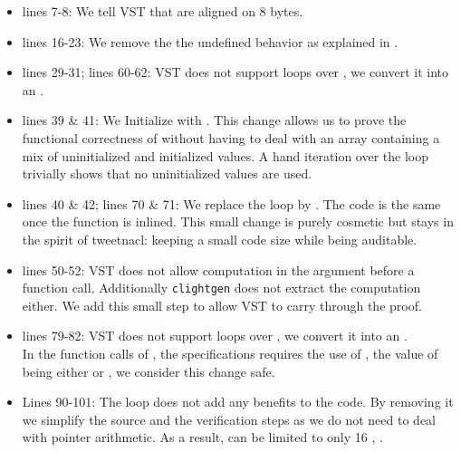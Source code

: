 \begin{itemize}
  \item lines 7-8: We tell VST that  are
  aligned on 8 bytes.

  \item lines 16-23: We remove the the undefined behavior as explained in .

  \item lines 29-31; lines 60-62: VST does not support  loops over , we convert it into an .

  \item lines 39 \& 41: We Initialize  with .
  This change allows us to prove the functional correctness of  without having to deal with an array containing
  a mix of uninitialized and initialized values.
  A hand iteration over the loop trivially shows that no uninitialized values are used.

  \item lines 40 \& 42; lines 70 \& 71: We replace the  loop by . The code is the same once the function is inlined. This small change is purely cosmetic but stays in the spirit of tweetnacl: keeping a small code size while being auditable.

  \item lines 50-52: VST does not allow computation in the argument before a function call. Additionally \texttt{clightgen} does not extract the computation either. We add this small step to allow VST to carry through the proof.



  \item lines 79-82: VST does not support  loops over , we convert it into an .\\
  In the function calls of , the specifications requires the use of , the value of  being either  or , we consider this change safe.

  \item Lines 90-101: The  loop does not add any benefits to the code. By removing it we simplify the source and the verification steps as we do not need to deal with pointer arithmetic. As a result,  can be limited to only 16 , \ie {}.

\end{itemize}

